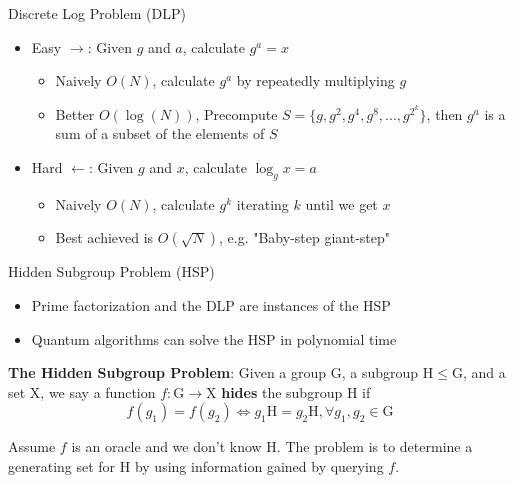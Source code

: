 \documentclass{beamer}
\begin{document}
\begin{frame}{Discrete Log Problem (DLP)}
\begin{itemize}
    \item Easy $\rightarrow$: Given $g$ and $a$, calculate $g^a = x$
    \begin{itemize}
        \item Naively $O(N)$, calculate $g^a$ by repeatedly multiplying $g$
        \item Better $O(\log(N))$, Precompute  $S = \{g, g^2, g^4, g^8, ..., g^{2^k}\}$, then $g^a$ is a sum of a subset of the elements of $S$
    \end{itemize}
        
    \item Hard $\leftarrow$: Given $g$ and $x$, calculate $\log_g{x} = a$
    \begin{itemize}
        \item Naively $O(N)$, calculate $g^k$ iterating $k$ until we get $x$
        \item Best achieved is $O(\sqrt{N})$, e.g. "Baby-step giant-step"
    \end{itemize}
\end{itemize}
    
\end{frame}

\begin{frame}{Hidden Subgroup Problem (HSP)}
    \begin{itemize}
        \item Prime factorization and the DLP are instances of the HSP
        \item Quantum algorithms can solve the HSP in polynomial time
    \end{itemize}
    \textbf{The Hidden Subgroup Problem}: Given a group $\mathrm{G}$, a subgroup $\mathrm{H}\leq \mathrm{G}$, and a set $\mathrm{X}$, we say a function $f:\mathrm{G} \rightarrow \mathrm{X}$ \textbf{hides} the subgroup $\mathrm{H}$ if 
    \[
            f(g_1) = f(g_2) \iff g_1\mathrm{H} = g_2\mathrm{H}, \forall g_1, g_2 \in \mathrm{G}
    \]

    
    Assume $f$ is an oracle and we don't know $\mathrm{H}$. The problem is to determine a generating set for $\mathrm{H}$ by using information gained by querying $f$.

\end{frame}
\end{document}
